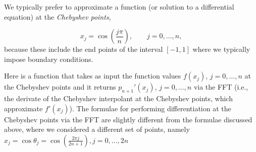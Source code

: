 \documentclass[12pt,a4paper]{article}
\begin{document}
We typically prefer to approximate a function (or solution to a differential equation) at the \emph{Chebyshev points}, 

\[
x_j = \cos\left(\frac{j\pi}{n}\right), \qquad j = 0, \ldots, n,
\]
because these include the end points of the interval $[-1, 1]$ where we typically impose boundary conditions.

Here is a function that takes as input the function values $f(x_j)$, $j = 0, \ldots, n$ at the Chebyshev points and it returns $p_{n+1}'(x_j)$, $j = 0, \ldots, n$ via the FFT (i.e., the derivate of the Chebyshev interpolant at the Chebyshev points, which approximate $f'(x_j)$). The formulae for performing differentiation at the Chebyshev points via the FFT are slightly different from the formulae discussed above, where we considered a different set of points, namely $x_j = \cos\theta_j = \cos\left( \frac{2\pi j}{2n + 1}  \right), j = 0, \ldots, 2n$
\end{document}
